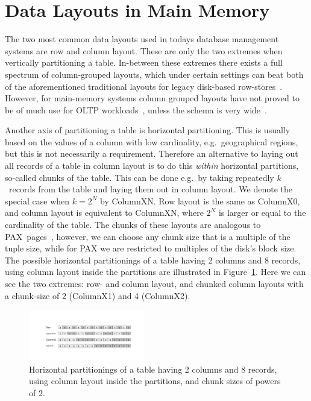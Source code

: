 \documentclass{sig-alternate}
\begin{document}
\section{Data Layouts in Main Memory}
\label{sec:layouts}

The two most common data layouts used in todays database management systems are row and column layout. These are only the two extremes when vertically partitioning a table. In-between these extremes there exists a full spectrum of column-grouped layouts, which under certain settings can beat both of the aforementioned traditional layouts for legacy disk-based row-stores~\cite{VP}. However, for main-memory systems column grouped layouts have not proved to be of much use for OLTP workloads~\cite{grund2010hyrise}, unless the schema is very wide~\cite{JITHybrid}.

Another axis of partitioning a table is horizontal partitioning. This is usually based on the values of a column with low cardinality, e.g.~geographical regions, but this is not necessarily a requirement. Therefore an alternative to laying out all records of a table in column layout is to do this \textit{within} horizontal partitions, so-called chunks of the table. This can be done e.g.~by taking repeatedly $k$~records from the table and laying them out in column layout. We denote the special case when $k=2^N$ by \mbox{ColumnXN}. Row layout is the same as ColumnX0, and column layout is equivalent to ColumnXN, where $2^N$ is larger or equal to the cardinality of the table. The chunks of these layouts are analogous to PAX~pages~\cite{PAX}, however, we can choose any chunk size that is a multiple of the tuple size, while for PAX we are restricted to multiples of the disk's block size. The possible horizontal partitionings of a table having 2 columns and 8 records, using column layout inside the partitions are illustrated in Figure~\ref{fig:ColumnXN}. Here we can see the two extremes: row- and column layout, and chunked column layouts with a chunk-size of 2 (ColumnX1) and 4 (ColumnX2). 

\begin{figure}[!h]
\vspace{-5pt}
\center
\includegraphics[width=0.45\textwidth]{pdf/ColumnXNIllustration.pdf}
\vspace{-10pt}
\caption{Horizontal partitionings of a table having 2 columns and 8 records, using column layout inside the partitions, and chunk sizes of powers of 2.}  
\label{fig:ColumnXN}
\vspace{-10pt}
\end{figure}
\end{document}
